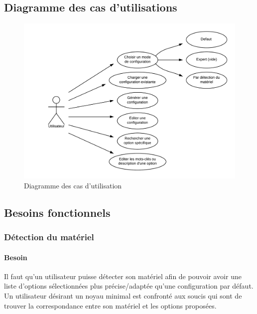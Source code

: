 \documentclass[16pts]{report}
\begin{document}
        \subsection{Diagramme des cas d'utilisations}
        \label{sub:Diagramme des cas d'utilisations}

\begin{figure}[H]
    \includegraphics[scale=0.25]{illustrations/diagramme_cas_utilisation.png}
    \centering
    \caption{Diagramme des cas d'utilisation}
    \label{fig:DCU}
\end{figure}

        \subsection{Besoins fonctionnels}
        \label{sub:Besoins fonctionnels}

\subsubsection{Détection du matériel}
\label{ssub:Détection du matériel}
\paragraph{Besoin}
\label{sssbus:Besoin}

Il faut qu’un utilisateur puisse détecter son matériel afin de pouvoir
avoir une liste d’options sélectionnées plus précise/adaptée qu’une
configuration par défaut. Un utilisateur désirant un noyau minimal est
confronté aux soucis qui sont de trouver la correspondance entre son matériel et
les options proposées.
\\
\end{document}

